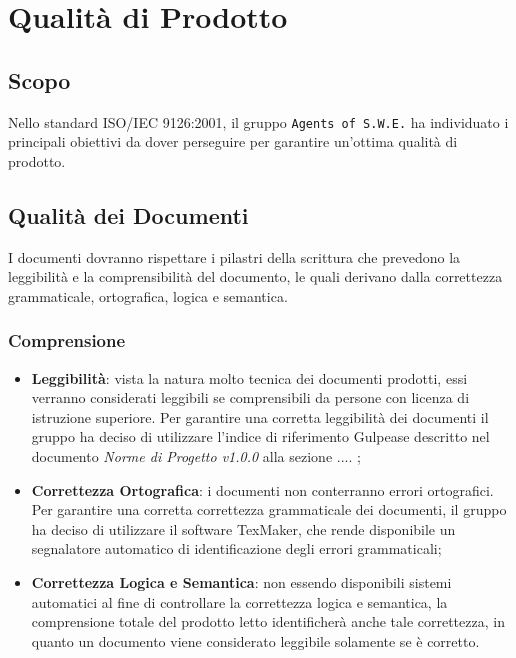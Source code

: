 \section{Qualità di Prodotto}
\label{qualitaProdotto}

\subsection{Scopo}

Nello standard ISO/IEC 9126:2001, il gruppo \texttt{Agents of S.W.E.} ha individuato i principali obiettivi da dover perseguire per garantire un'ottima qualità di prodotto.  

\subsection{Qualità dei Documenti}

I documenti dovranno rispettare i pilastri della scrittura che prevedono la leggibilità e la comprensibilità del documento, le quali derivano dalla correttezza grammaticale, ortografica, logica e semantica.

\subsubsection{Comprensione}

\begin{itemize}
	\item \textbf{Leggibilità}: vista la natura molto tecnica dei documenti prodotti, essi verranno considerati leggibili se comprensibili da persone con licenza di istruzione superiore. Per garantire una corretta leggibilità dei documenti il gruppo ha deciso di utilizzare l'indice di riferimento Gulpease descritto nel documento \textit{Norme di Progetto v1.0.0} alla sezione .... ;
	\item \textbf{Correttezza Ortografica}: i documenti non conterranno errori ortografici. Per garantire una corretta correttezza grammaticale dei documenti, il gruppo ha deciso di utilizzare il software TexMaker, che rende disponibile un segnalatore automatico di identificazione degli errori grammaticali;
	\item \textbf{Correttezza Logica e Semantica}: non essendo disponibili sistemi automatici al fine di controllare 
la correttezza logica e semantica, la comprensione totale del prodotto letto identificherà anche tale correttezza, in quanto un documento viene considerato leggibile solamente se è corretto.
\end{itemize}

